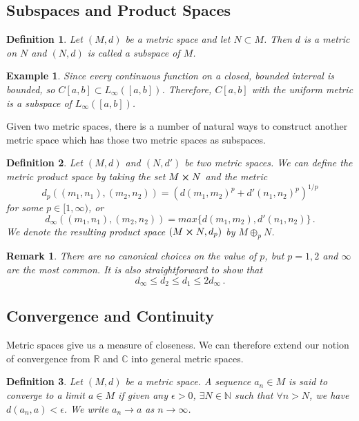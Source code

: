 \documentclass{article}
\theoremstyle{plain}\theoremheaderfont{\normalfont\itshape}\theorembodyfont{\rmfamily}\theoremseparator{.}\newtheorem*{rem}{Remark}\newtheorem*{ex}{Example}\newtheorem*{proof}{Proof}\newtheorem*{altp}{Alternative proof}
\theoremstyle{plain}\theoremheaderfont{\normalfont\bfseries}\theorembodyfont{\rmfamily}\theoremseparator{.}\newtheorem{thm}{Theorem}[section]\newtheorem{lem}[thm]{Lemma}\newtheorem{prop}[thm]{Proposition}\newtheorem*{cor}{Corollary}\newtheorem{defn}[thm]{Definition}\newtheorem{clm}[thm]{Claim}\newtheorem{clminproof}{Claim}
\theoremstyle{break}\theoremheaderfont{\normalfont\itshape}\theorembodyfont{\rmfamily}\theoremseparator{.\medskip}\newtheorem*{proofskip}{Proof}\newtheorem*{exs}{Examples}\newtheorem*{rems}{Remarks}
\theoremstyle{break}\theoremheaderfont{\normalfont\bfseries}\theorembodyfont{\rmfamily}\theoremseparator{.\medskip}\newtheorem{lemskip}[thm]{Lemma}\newtheorem{defnskip}[thm]{Definition}\newtheorem{propskip}[thm]{Proposition}\newtheorem{thmskip}[thm]{Theorem}
\begin{document}
    \subsection{Subspaces and Product Spaces}
    \begin{defn}
        Let \((M,d)\) be a metric space and let \(N\subset M\). Then \(d\) is a metric on \(N\) and \((N,d)\) is called a \textit{subspace} of \(M\).
    \end{defn}

    \begin{ex}
        Since every continuous function on a closed, bounded interval is bounded, so \(C[a,b]\subset L_\infty([a,b])\). Therefore, \(C[a,b]\) with the uniform metric is a subspace of \(L_\infty([a,b])\).
    \end{ex}

    Given two metric spaces, there is a number of natural ways to construct another metric space which has those two metric spaces as subspaces.
    \begin{defn}
        Let \((M,d)\) and \((N,d')\) be two metric spaces. We can define the metric \textit{product space} by taking the set \(M\cross N\) and the metric
        \[d_p((m_1,n_1),(m_2,n_2))=(d(m_1,m_2)^p+d'(n_1,n_2)^p)^{1/p}\]
        for some \(p\in[1,\infty)\), or
        \[d_\infty((m_1,n_1),(m_2,n_2))=max\{d(m_1,m_2),d'(n_1,n_2)\}\,.\]
        We denote the resulting product space \((M\cross N,d_p)\) by \(M\oplus_p N\).
    \end{defn}
    \begin{rem}
        There are no canonical choices on the value of \(p\), but \(p=1,2\) and \(\infty\) are the most common. It is also straightforward to show that
        \[d_\infty\le d_2\le d_1\le 2d_\infty\,.\]
    \end{rem}
    
    \subsection{Convergence and Continuity}
    Metric spaces give us a measure of closeness. We can therefore extend our notion of convergence from \(\mathbb{R}\) and \(\mathbb{C}\) into general metric spaces.
    \begin{defn}
        Let \((M,d)\) be a metric space. A sequence \(a_n\in M\) is said to \textit{converge} to a limit \(a\in M\) if given any \(\epsilon>0\), \(\exists N\in\mathbb{N}\) such that \(\forall n>N\), we have \(d(a_n,a)<\epsilon\). We write \(a_n\to a\) as \(n\to\infty\).
    \end{defn}
\end{document}
